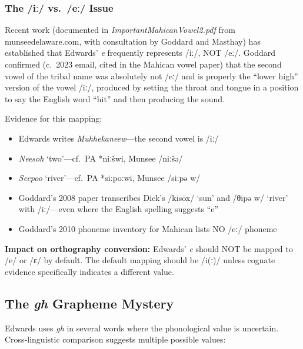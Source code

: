 \subsubsection{The /iː/ vs.\ /eː/ Issue}

Recent work (documented in \emph{ImportantMahicanVowel2.pdf} from
munseedelaware.com, with consultation by Goddard and Masthay) has established
that Edwards' \textit{e} frequently represents /iː/, NOT /eː/. Goddard
confirmed (c.\ 2023 email, cited in the Mahican vowel paper) that the second
vowel of the tribal name was absolutely not /eː/ and is properly the ``lower
high'' version of the vowel /iː/, produced by setting the throat and tongue
in a position to say the English word ``hit'' and then producing the sound.

Evidence for this mapping:

\begin{itemize}
  \item Edwards writes \textit{Muhhekaneew}---the second vowel is /iː/
  \item \textit{Neesoh} `two'---cf.\ PA *niːšwi, Munsee /niːšə/
  \item \textit{Seepoo} `river'---cf.\ PA *siːpoːwi, Munsee /siːpə w/
  \item Goddard's 2008 paper transcribes Dick's /kīsōx/ `sun' and /θ{}īpə w/
    `river' with /iː/---even where the English spelling suggests ``e''
  \item Goddard's 2010 phoneme inventory for Mahican lists NO /eː/ phoneme
\end{itemize}

\textbf{Impact on orthography conversion:} Edwards' \textit{e} should NOT be
mapped to /e/ or /ɛ/ by default. The default mapping should be /i(ː)/ unless
cognate evidence specifically indicates a different value.

\subsection{The \textit{gh} Grapheme Mystery}
\label{sec:1369-gh}

Edwards uses \textit{gh} in several words where the phonological value is
uncertain. Cross-linguistic comparison suggests multiple possible values:

